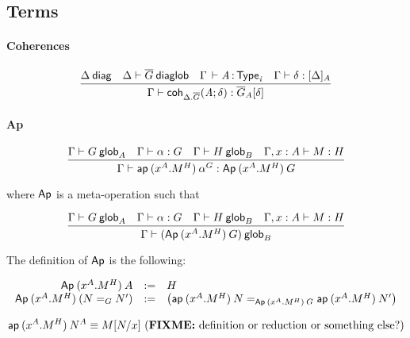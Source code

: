 \subsection{Terms}

\paragraph{Coherences}

\begin{small}
  \[
  \infer{\ofglob{\Gamma}{\coh{{\Delta}.\diag{G}}{A}{\delta}}
    {\interpglob{\diag{G}}{A}{\delta}}}
  {\wfdiag{\Delta}
    & \wfdiaglob{\Delta}{\diag G}
    & \oftp{\Gamma}{A}{\typ{i}}
    & \ofinterp{\Gamma}{\delta}{\Delta}{A}}
  \]
\end{small}

\paragraph{Ap}

\begin{small}
  \[\infer{\ofglob{\Gamma}{\ap{(x^A.M^H)}{\alpha^G}}
    {\Ap{(x^A.M^H)}{G}}}
  {\wfglob{\Gamma}{G}{n}{A}
    & \ofglob{\Gamma}{\alpha}{G}
    & \wfglob{\Gamma}{H}{m}{B}
    & \ofglob{\Gamma,x:A}{M}{H}}\]

  where $\dsd{Ap}$ is a meta-operation such that

  \[\infer{\wfglob{\Gamma}{(\Ap{(x^A.M^H)}{G})}{n+m}
    {B}}
  {\wfglob{\Gamma}{G}{n}{A}
    & \ofglob{\Gamma}{\alpha}{G}
    & \wfglob{\Gamma}{H}{m}{B}
    & \ofglob{\Gamma,x:A}{M}{H}}\]

  The definition of $\dsd{Ap}$ is the following:

  \[
  \begin{array}{rcl}
    \Ap{(x^A.M^H)}{A} & := & H \\
    \Ap{(x^A.M^H)}{(\homj{G}{N}{N'})} & := & \left(
      \homj{\Ap{(x^A.M^H)}{G}}
      {\ap{(x^A.M^H)}{N}}{\ap{(x^A.M^H)}{N'}}\right)
  \end{array}
  \]
\end{small}

\begin{small}
  \[
  \ap{(x^A.M^H)}{N^A}  \equiv  \subst{M}{N}{x}
  \text{ (\FIXME{definition or reduction or something else?})} \\ \\
  \]
\end{small}

